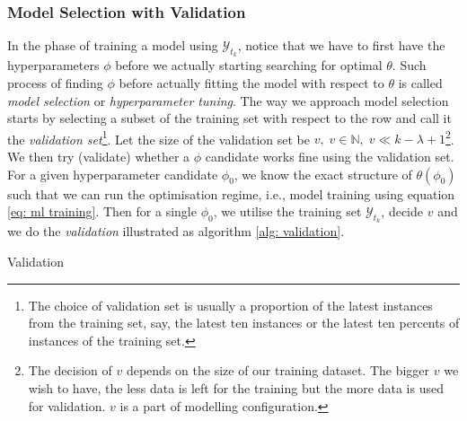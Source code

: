 \subsubsection{Model Selection with Validation}
In the phase of training a model using $\mathcal{Y}_{t_k}$, notice that we have to first have the hyperparameters $\phi$ before we actually starting searching for optimal $\theta$. Such process of finding $\phi$ before actually fitting the model with respect to $\theta$ is called \textit{model selection} or \textit{hyperparameter tuning}. The way we approach model selection starts by selecting a subset of the training set with respect to the row and call it the \textit{validation set}\footnote{The choice of validation set is usually a proportion of the latest instances from the training set, say, the latest ten instances or the latest ten percents of instances of the training set.}. Let the size of the validation set be $v, \; v \in \mathbb{N}, \; v \ll k - \lambda + 1$\footnote{The decision of $v$ depends on the size of our training dataset. The bigger $v$ we wish to have, the less data is left for the training but the more data is used for validation. $v$ is a part of modelling configuration.}. We then try (validate) whether a $\phi$ candidate works fine using the validation set. For a given hyperparameter candidate $\phi_0$, we know the exact structure of $\theta(\phi_0)$ such that we can run the optimisation regime, i.e., model training using equation \ref{eq: ml training}. Then for a single $\phi_0$, we utilise the training set $\mathcal{Y}_{t_k}$, decide $v$ and we do the \textit{validation} illustrated as algorithm \ref{alg: validation}.
\begin{algorithm}
    \caption{Validation}\label{alg: validation}
    \begin{algorithmic}
    \EndFor
    \end{algorithmic}
\end{algorithm}
